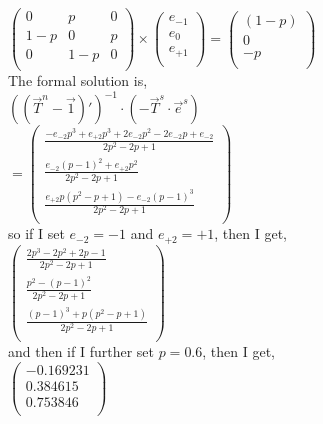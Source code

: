\documentclass{article}
\begin{document}
$
\left(
\begin{array}{ccc}
 0 & p & 0 \\
 1-p & 0 & p \\
 0 & 1-p & 0 \\
\end{array}
\right) \times
\left(
\begin{array}{c}
 e_{-1} \\
 e_{0} \\
 e_{+1} \\
\end{array}
\right) = 
\left(
\begin{array}{c}
 (1-p) \\
 0 \\
 -p \\
\end{array}
\right)
$ \\



The formal solution is, \\

$ ((\vec{T}^{n}-\vec{1})')^{-1} \cdot (- \vec{T}^{s} \cdot \vec{e}^{s})$ \\

$
=  \left(
\begin{array}{c}
 \frac{-{e_{-2}} p^3+{e_{+2}} p^3+2 {e_{-2}} p^2-2 {e_{-2}} p+{e_{-2}}}{2 p^2-2 p+1} \\
 \frac{{e_{-2}} (p-1)^2+{e_{+2}} p^2}{2 p^2-2 p+1} \\
 \frac{{e_{+2}} p \left(p^2-p+1\right)-{e_{-2}} (p-1)^3}{2 p^2-2 p+1} \\
\end{array}
\right)
$ \\

so if I set $e_{-2} = -1$ and $e_{+2} = +1$, then I get, \\

$
\left(
\begin{array}{c}
 \frac{2 p^3-2 p^2+2 p-1}{2 p^2-2 p+1} \\
 \frac{p^2-(p-1)^2}{2 p^2-2 p+1} \\
 \frac{(p-1)^3+p \left(p^2-p+1\right)}{2 p^2-2 p+1} \\
\end{array}
\right)
$ \\

and then if I further set $p = 0.6$, then I get, \\

$
\left(
\begin{array}{c}
 -0.169231 \\
 0.384615 \\
 0.753846 \\
\end{array}
\right)
$ \\
\end{document}

